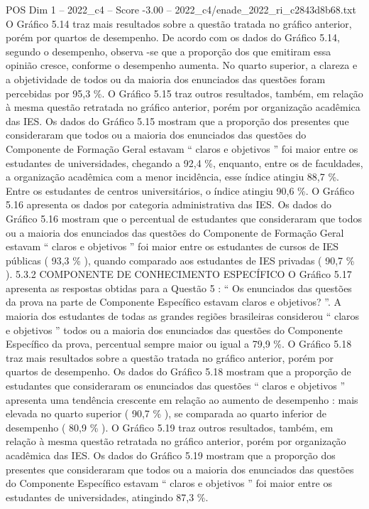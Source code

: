 \begin{textsample}{POS Dim 1 – 2022\_c4 – Score -3.00 – 2022\_c4/enade\_2022\_ri\_c2843d8b68.txt}
O Gráfico 5.14 traz mais resultados sobre a questão tratada no gráfico anterior, porém por quartos de desempenho.
De acordo com os dados do Gráfico 5.14, segundo o desempenho, observa -se que a proporção dos que emitiram essa opinião cresce, conforme o desempenho aumenta.
No quarto superior, a clareza e a objetividade de todos ou da maioria dos enunciados das questões foram percebidas por 95,3 \%.
O Gráfico 5.15 traz outros resultados, também, em relação à mesma questão retratada no gráfico anterior, porém por organização acadêmica das IES.
Os dados do Gráfico 5.15 mostram que a proporção dos presentes que consideraram que todos ou a maioria dos enunciados das questões do Componente de Formação Geral estavam “ claros e objetivos ” foi maior entre os estudantes de universidades, chegando a 92,4 \%, enquanto, entre os de faculdades, a organização acadêmica com a menor incidência, esse índice atingiu 88,7 \%.
Entre os estudantes de centros universitários, o índice atingiu 90,6 \%.
O Gráfico 5.16 apresenta os dados por categoria administrativa das IES.
Os dados do Gráfico 5.16 mostram que o percentual de estudantes que consideraram que todos ou a maioria dos enunciados das questões do Componente de Formação Geral estavam “ claros e objetivos ” foi maior entre os estudantes de cursos de IES públicas ( 93,3 \% ), quando comparado aos estudantes de IES privadas ( 90,7 \% ). 5.3.2 COMPONENTE DE CONHECIMENTO ESPECÍFICO O Gráfico 5.17 apresenta as respostas obtidas para a Questão 5 : “ Os enunciados das questões da prova na parte de Componente Específico estavam claros e objetivos? ”.
A maioria dos estudantes de todas as grandes regiões brasileiras considerou “ claros e objetivos ” todos ou a maioria dos enunciados das questões do Componente Específico da prova, percentual sempre maior ou igual a 79,9 \%.
O Gráfico 5.18 traz mais resultados sobre a questão tratada no gráfico anterior, porém por quartos de desempenho.
Os dados do Gráfico 5.18 mostram que a proporção de estudantes que consideraram os enunciados das questões “ claros e objetivos ” apresenta uma tendência crescente em relação ao aumento de desempenho : mais elevada no quarto superior ( 90,7 \% ), se comparada ao quarto inferior de desempenho ( 80,9 \% ).
O Gráfico 5.19 traz outros resultados, também, em relação à mesma questão retratada no gráfico anterior, porém por organização acadêmica das IES.
Os dados do Gráfico 5.19 mostram que a proporção dos presentes que consideraram que todos ou a maioria dos enunciados das questões do Componente Específico estavam “ claros e objetivos ” foi maior entre os estudantes de universidades, atingindo 87,3 \%.

\end{textsample}
